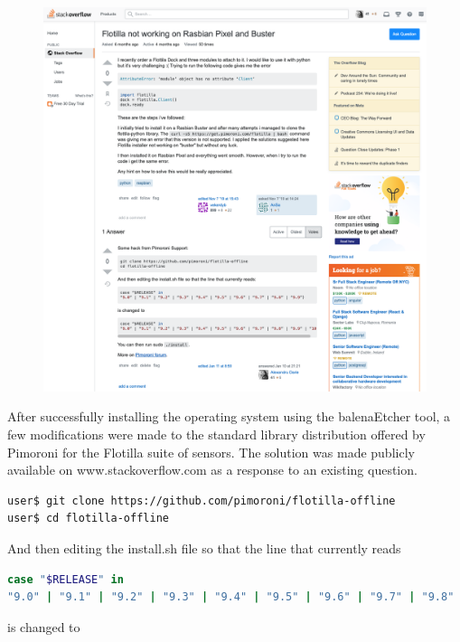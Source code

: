 \begin{figure}[!htb]
    \centering
    \includegraphics[width = 15.5cm]{figures/sde2}
    \label{fig:sde2}
\end{figure}

After successfully installing the operating system using the balenaEtcher tool, a few modifications were made to the standard library distribution offered by Pimoroni for the Flotilla suite of sensors. The solution \cite{stovlf} was made publicly available on www.stackoverflow.com as a response to an existing question.

\begin{lstlisting}[language=bash]
user$ git clone https://github.com/pimoroni/flotilla-offline
user$ cd flotilla-offline
\end{lstlisting}

\hspace{-6mm}And then editing the install.sh file so that the line that currently reads

\begin{lstlisting}[language=bash]
case "$RELEASE" in
"9.0" | "9.1" | "9.2" | "9.3" | "9.4" | "9.5" | "9.6" | "9.7" | "9.8" | "9.9")
\end{lstlisting}

\hspace{-6mm}is changed to

